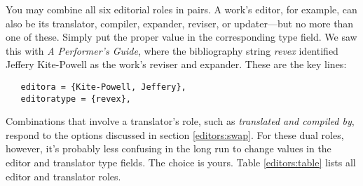\documentclass[11pt,letterpaper,oneside]{article}
\begin{document}
\begin{citebib}
\item \cite{schechter2011}
\item \cite{turabian2013}
\end{citebib}

You may combine all six editorial roles in pairs. A work's editor, for
example, can also be its translator, compiler, expander, reviser, or
updater---but no more than one of these. Simply put the proper value
in the corresponding type field. We saw this with \textit{A
Performer's Guide}, where the bibliography string \textit{revex}
identified Jeffery Kite-Powell as the work's reviser and expander.
These are the key lines:

\begin{verbatim}
   editora = {Kite-Powell, Jeffery},
   editoratype = {revex},
\end{verbatim}

\noindent Combinations that involve a translator's role, such as
\textit{translated and compiled by}, respond to the 
options discussed in section \ref{editors:swap}. For these dual roles,
however, it's probably less confusing in the long run to change values
in the editor and translator type fields. The choice is yours. Table
\ref{editors:table} lists all editor and translator roles.
\end{document}
